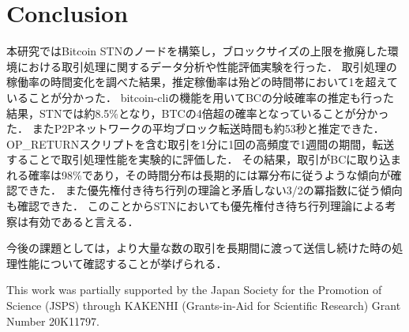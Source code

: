 \documentclass[graybox]{svmult}
\begin{document}
\section{Conclusion}
\label{sec:conclusion}

本研究ではBitcoin STNのノードを構築し，ブロックサイズの上限を撤廃した環境における取引処理に関するデータ分析や性能評価実験を行った．
取引処理の稼働率の時間変化を調べた結果，推定稼働率は殆どの時間帯において1を超えていることが分かった．
bitcoin-cliの機能を用いてBCの分岐確率の推定も行った結果，STNでは約8.5\%となり，BTCの4倍超の確率となっていることが分かった．
またP2Pネットワークの平均ブロック転送時間も約53秒と推定できた．
OP\_RETURNスクリプトを含む取引を1分に1回の高頻度で1週間の期間，転送することで取引処理性能を実験的に評価した．
その結果，取引がBCに取り込まれる確率は98\%であり，その時間分布は長期的には冪分布に従うような傾向が確認できた．
また優先権付き待ち行列の理論と矛盾しない3/2の冪指数に従う傾向も確認できた．
このことからSTNにおいても優先権付き待ち行列理論による考察は有効であると言える．

今後の課題としては，より大量な数の取引を長期間に渡って送信し続けた時の処理性能について確認することが挙げられる．



\begin{acknowledgement}
 This work was partially supported by the Japan Society for the Promotion of 
Science (JSPS) through KAKENHI (Grants-in-Aid for Scientific Research) Grant 
Number 20K11797. 
\end{acknowledgement}



%
\end{document}
